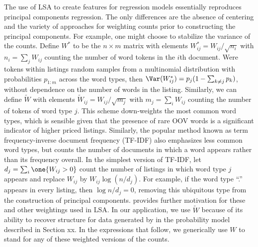\documentclass[12pt]{article}
\begin{document}
The use of LSA to create features for regression models essentially reproduces principal components regression.  The only differences are the absence of centering and the variety of approaches for weighting counts prior to constructing the principal components. For example, one might choose to stabilize the variance of the counts.  Define ${W}^{*}$ to be the $n \times m$ matrix with elements ${W}^{*}_{ij} = W_{ij}/\sqrt{n_i}$ with $n_i = \sum_j W_{ij}$ counting the number of word tokens in the $i$th document.  Were tokens within listings random samples from
 a multinomial distribution with probabilities $p_{1:m}$ across the word types, then $\Var({W}^{*}_{ij}) = p_j(1-\sum_{k\ne j} p_k)$, without dependence on the number of words in the listing. Similarly, we can define $\tilde{W}$ with elements $\tilde{W}_{ij} = W_{ij}/\sqrt{m_j}$ with $m_j = \sum_i W_{ij}$ counting the number of tokens of word type $j$. This scheme down-weights the most common word types, which is sensible given that the presence of rare  OOV words is a significant indicator of higher priced listings.  Similarly, the popular method known as term frequency-inverse document frequency (TF-IDF) also emphasizes less common word types, but counts the number of documents in which a word appears rather than its frequency overall.  In the simplest version of TF-IDF,  let $d_j = \sum _i\one{W_{ij} >
 0}$ count the number of listings in which word type $j$ appears and replace $W_{ij}$ by
 $W_{ij} \log(n/d_j)$.  For example, if the word type ``.'' appears in
 every listing, then $\log n/d_j = 0$, removing this ubiquitous
 type from the construction of principal components.
 \citet{turney10} provides further motivation for these and other weightings used in LSA.
  In our application, we use $\tilde{W}$ because of  its ability to recover structure for data generated by in the probability model described in Section {xx}.  In the expressions that follow, we generically use $W$ to stand for any of these weighted versions of the counts.
 
\end{document}
